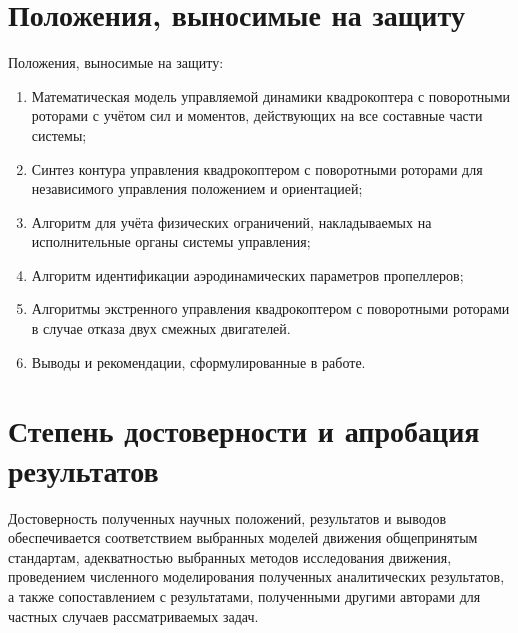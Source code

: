\section{Положения, выносимые на защиту}
Положения, выносимые на защиту:
\begin{enumerate}
	\item Математическая модель управляемой динамики квадрокоптера с поворотными роторами с учётом сил и моментов, действующих на все составные части системы;
	\item Синтез контура управления квадрокоптером с поворотными роторами для независимого управления положением и ориентацией; 
	\item Алгоритм для учёта физических ограничений, накладываемых на исполнительные органы системы управления;
	\item Алгоритм идентификации аэродинамических параметров пропеллеров;
	\item Алгоритмы экстренного управления квадрокоптером с поворотными роторами в случае отказа двух смежных двигателей.
	\item Выводы и рекомендации, сформулированные в работе.
\end{enumerate}

\section{Степень достоверности и апробация результатов}
Достоверность полученных научных положений, результатов и выводов обеспечивается
соответствием выбранных моделей движения общепринятым стандартам,
адекватностью выбранных методов исследования движения,
проведением численного моделирования полученных аналитических результатов,
а также сопоставлением с результатами,
полученными другими авторами для частных случаев рассматриваемых задач.

